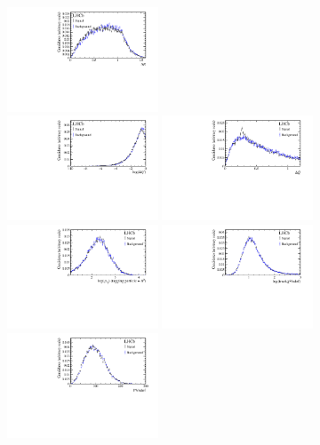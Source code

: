 \begin{figure}[tbp]
\begin{center}
		\includegraphics[width=0.40\textwidth]{08FlavourTagging/figs/BDT_TagPart_B_deltaR.pdf}\\
		\includegraphics[width=0.40\textwidth]{08FlavourTagging/figs/BDT_deta_flat_log.pdf}
		\includegraphics[width=0.40\textwidth]{08FlavourTagging/figs/BDT_TagPart_B_DeltaQ_pion.pdf}\\
		\includegraphics[width=0.40\textwidth]{08FlavourTagging/figs/BDT_TagPart_B_Combined_Pt_log.pdf}
		\includegraphics[width=0.40\textwidth]{08FlavourTagging/figs/BDT_cs_flat.pdf}\\
		\includegraphics[width=0.40\textwidth]{08FlavourTagging/figs/BDT_PVndof.pdf}

\end{center}
\end{figure}

